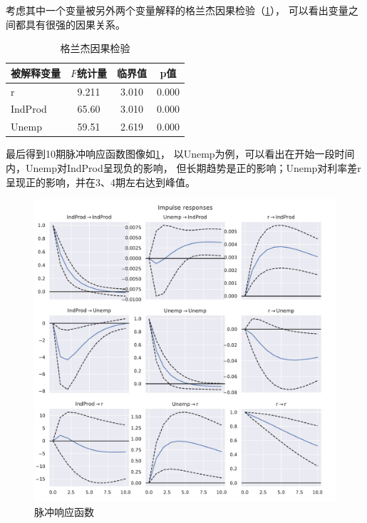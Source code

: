 \documentclass[cn]{homework}
\begin{document}
    考虑其中一个变量被另外两个变量解释的格兰杰因果检验（\cref{tab:Granger}），
    可以看出变量之间都具有很强的因果关系。
    \begin{table}
        \centering
        \begin{tabular}{lccc}
            \toprule
            被解释变量 & $F$统计量 & 临界值 & p值 \\
            \midrule
            r & 9.211 & 3.010 &  0.000 \\
            IndProd & 65.60 & 3.010 & 0.000 \\
            Unemp & 59.51 & 2.619 & 0.000 \\
            \bottomrule
        \end{tabular}
        \caption{格兰杰因果检验}
        \label{tab:Granger}
    \end{table}

    最后得到10期脉冲响应函数图像如\cref{fig:irf}，
    以Unemp为例，可以看出在开始一段时间内，Unemp对IndProd呈现负的影响，
    但长期趋势是正的影响；Unemp对利率差r呈现正的影响，并在3、4期左右达到峰值。
    \begin{figure}[h]
        \centering
        \includegraphics[width=\textwidth]{irf}
        \caption{脉冲响应函数}
        \label{fig:irf}
    \end{figure}
\end{document}

